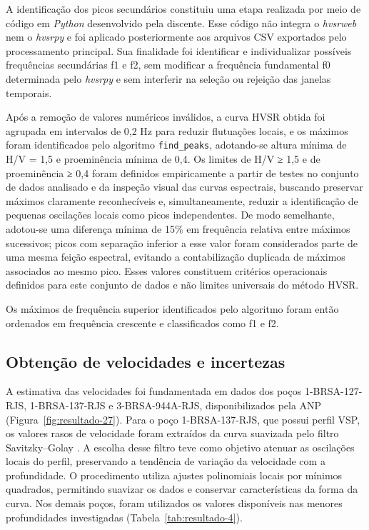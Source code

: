 A identificação dos picos secundários constituiu uma etapa realizada por meio de código em \textit{Python} desenvolvido pela discente. Esse código não integra o \textit{hvsrweb} nem o \textit{hvsrpy} e foi aplicado posteriormente aos arquivos CSV exportados pelo processamento principal. Sua finalidade foi identificar e individualizar possíveis frequências secundárias f1 e f2, sem modificar a frequência fundamental f0 determinada pelo \textit{hvsrpy} e sem interferir na seleção ou rejeição das janelas temporais.

Após a remoção de valores numéricos inválidos, a curva HVSR obtida foi agrupada em intervalos de 0,2 Hz para reduzir flutuações locais, e os máximos foram identificados pelo algoritmo \texttt{find\_peaks}, adotando-se altura mínima de H/V = 1,5 e proeminência mínima de 0,4. Os limites de H/V ≥ 1,5 e de proeminência ≥ 0,4 foram definidos empiricamente a partir de testes no conjunto de dados analisado e da inspeção visual das curvas espectrais, buscando preservar máximos claramente reconhecíveis e, simultaneamente, reduzir a identificação de pequenas oscilações locais como picos independentes. De modo semelhante, adotou-se uma diferença mínima de 15\% em frequência relativa entre máximos sucessivos; picos com separação inferior a esse valor foram considerados parte de uma mesma feição espectral, evitando a contabilização duplicada de máximos associados ao mesmo pico. Esses valores constituem critérios operacionais definidos para este conjunto de dados e não limites universais do método HVSR.

Os máximos de frequência superior identificados pelo algoritmo foram então ordenados em frequência crescente e classificados como f1 e f2.

\subsection{Obtenção de velocidades e incertezas}\label{sec:4-6-2}

A estimativa das velocidades foi fundamentada em dados dos poços 1-BRSA-127-RJS, 1-BRSA-137-RJS e 3-BRSA-944A-RJS, disponibilizados pela ANP (Figura~\ref{fig:resultado-27}). Para o poço 1-BRSA-137-RJS, que possui perfil VSP, os valores rasos de velocidade foram extraídos da curva suavizada pelo filtro Savitzky--Golay \cite{savitzky1964}. A escolha desse filtro teve como objetivo atenuar as oscilações locais do perfil, preservando a tendência de variação da velocidade com a profundidade. O procedimento utiliza ajustes polinomiais locais por mínimos quadrados, permitindo suavizar os dados e conservar características da forma da curva. Nos demais poços, foram utilizados os valores disponíveis nas menores profundidades investigadas (Tabela~\ref{tab:resultado-4}).

